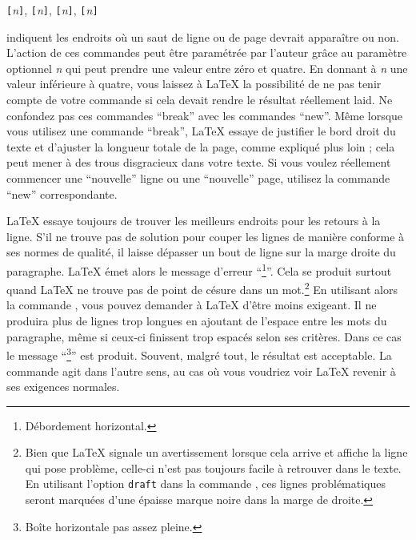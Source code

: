 \begin{lscommand}
\verb|[|\emph{n}\verb|]|,
\verb|[|\emph{n}\verb|]|,
\verb|[|\emph{n}\verb|]|,
\verb|[|\emph{n}\verb|]|
\end{lscommand}
\noindent indiquent les endroits où un saut de ligne ou de page devrait
apparaître ou non. L'action de ces commandes peut être paramétrée par l'auteur
grâce au paramètre optionnel \emph{n}
qui peut prendre une valeur entre zéro et quatre. En donnant à \emph{n}
une valeur inférieure à quatre, vous laissez à \LaTeX{} la possibilité
de ne pas tenir compte de votre commande si cela devait rendre le
résultat réellement laid.  Ne confondez pas ces commandes \enquote{break}
avec les commandes \enquote{new}.  Même lorsque vous utilisez
une commande \enquote{break}, \LaTeX{} essaye de justifier le bord
droit du texte et d'ajuster la longueur totale de la page, comme
expliqué plus loin ; cela peut mener à des trous disgracieux dans
votre texte.  Si vous voulez réellement commencer une \enquote{nouvelle}
ligne ou une \enquote{nouvelle} page, utilisez la commande \enquote{new}
correspondante.

\LaTeX{} essaye toujours de trouver les meilleurs endroits pour les
retours à la ligne.
S'il ne trouve pas de solution pour couper les lignes de
manière conforme à ses normes de qualité, il laisse dépasser un bout
de ligne sur la marge droite du paragraphe. \LaTeX{} émet alors le
message d'erreur
\enquote{\footnote{Débordement horizontal.}}.
Cela se produit surtout quand \LaTeX{} ne trouve pas
de point de césure dans un mot.\footnote{Bien que \LaTeX{} signale un
  avertissement lorsque cela arrive et affiche la
  ligne qui pose problème, celle-ci n'est pas toujours facile à
  retrouver dans le texte. En utilisant l'option \texttt{draft} dans
  la commande , ces lignes problématiques seront
  marquées d'une épaisse marque noire dans la marge de droite.}
En utilisant alors la commande ,
vous pouvez demander à \LaTeX{} d'être moins exigeant. Il ne produira
 plus de lignes trop longues en ajoutant de l'espace entre les
mots du paragraphe, même si ceux-ci finissent trop espacés selon ses
critères. Dans ce cas le message
\enquote{\footnote{Boîte horizontale pas assez pleine.}}
est produit. Souvent, malgré tout, le
résultat est acceptable. La commande  agit dans l'autre
sens, au cas où vous voudriez voir \LaTeX{} revenir à ses exigences
normales.

